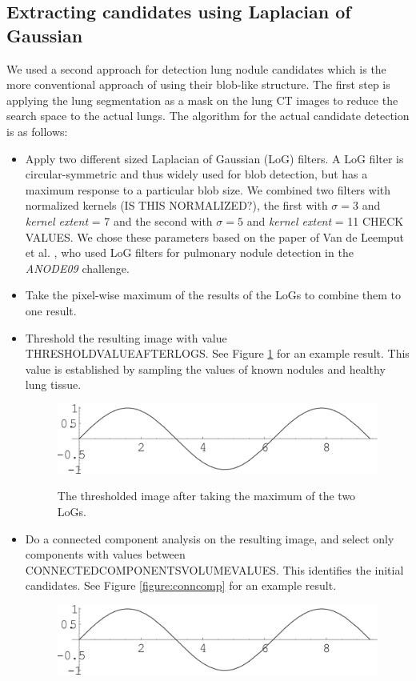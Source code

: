 \documentclass{article}
\begin{document}
\subsection{Extracting candidates using Laplacian of Gaussian}
We used a second approach for detection lung nodule candidates which is the more conventional approach of using their blob-like structure. The first step is applying the lung segmentation as a mask on the lung CT images to reduce the search space to the actual lungs. The algorithm for the actual candidate detection is as follows:

\begin{itemize}
\item Apply two different sized Laplacian of Gaussian (LoG) filters. A LoG filter is circular-symmetric and thus widely used for blob detection, but has a maximum response to a particular blob size. We combined two filters with normalized kernels (IS THIS NORMALIZED?), the first with $\sigma = 3$ and \emph{kernel extent} = 7 and the second with $\sigma = 5$ and \emph{kernel extent} = 11 CHECK VALUES. We chose these parameters based on the paper of Van de Leemput et al. \cite{leemput}, who used LoG filters for pulmonary nodule detection in the \emph{ANODE09} challenge.
\item Take the pixel-wise maximum of the results of the LoGs to combine them to one result.
\item Threshold the resulting image with value THRESHOLDVALUEAFTERLOGS. See Figure \ref{figure:LoGresult} for an example result. This value is established by sampling the values of known nodules and healthy lung tissue.
	\begin{figure}[h]
	\centering
	{\includegraphics[width=0.7\linewidth]{./figure.png}}
	\caption{The thresholded image after taking the maximum of the two LoGs. \label{figure:LoGresult}}
	\end{figure}
\item Do a connected component analysis on the resulting image, and select only components with values between CONNECTEDCOMPONENTSVOLUMEVALUES. This identifies the initial candidates. See Figure \ref{figure:conncomp} for an example result.
	\begin{figure}[h]
	\centering
	{\includegraphics[width=0.7\linewidth]{./figure.png}}

\end{figure}
\end{itemize}
\end{document}
